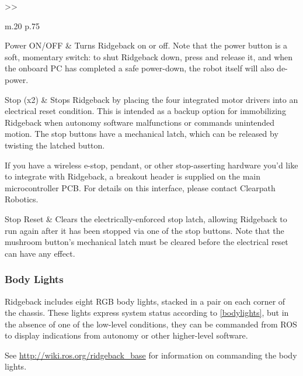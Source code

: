 \documentclass[]{clearpath-latex/clearpath-manual}
\begin{document}
\bgroup
\def\arraystretch{1.2}%
\begin{table}[h]
	\centering
	\begin{tabular}{>{}>{\raggedright}m{.20\textwidth} p{.75\textwidth}} \hline

	Power ON/OFF & Turns Ridgeback on or off. Note that the power button is a soft, momentary switch: to shut Ridgeback down, press and release it, and when the onboard PC has completed a safe power-down, the robot itself will also de-power. \\ \hline

	Stop (x2) & Stops Ridgeback by placing the four integrated motor drivers into an electrical reset condition. This is intended as a backup option for immobilizing Ridgeback when autonomy software malfunctions or commands unintended motion. The stop buttons have a mechanical latch, which can be released by twisting the latched button.

	If you have a wireless e-stop, pendant, or other stop-asserting hardware you'd like to integrate with Ridgeback, a breakout header is supplied on the main microcontroller PCB. For details on this interface, please contact Clearpath Robotics. \\ \hline

	Stop Reset & Clears the electrically-enforced stop latch, allowing Ridgeback to run again after it has been stopped via one of the stop buttons. Note that the mushroom button's mechanical latch must be cleared before the electrical reset can have any effect. \\ \hline
	\end{tabular}
\newline
\caption{Ridgeback Rear Buttons}
\label{rearbuttons}
\end{table}
\egroup


\pagebreak[4]
\subsubsection{Body Lights}

Ridgeback includes eight RGB body lights, stacked in a pair on each corner of the chassis. These lights express system status according to \autoref{bodylights}, but in the absence of one of the low-level conditions, they can be commanded from ROS to display indications from autonomy or other higher-level software.

See \url{http://wiki.ros.org/ridgeback_base} for information on commanding the body lights.
\end{document}
